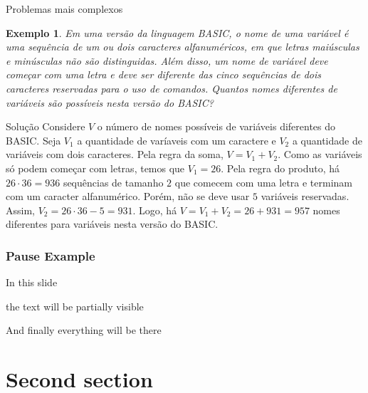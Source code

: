 \documentclass[aspectratio=169,t]{beamer}
\newtheorem{ex}{Exemplo}
\begin{document}
 \begin{frame}{Problemas mais complexos}
\footnotesize
  \begin{ex}
Em uma versão da linguagem BASIC, o nome de uma variável é uma sequência de um ou dois caracteres alfanuméricos, em que letras maiúsculas e minúsculas não são distinguidas. Além disso, um nome de variável deve começar com uma letra e deve ser diferente das cinco sequências de dois caracteres reservadas para o uso de comandos. Quantos nomes diferentes de variáveis são possíveis nesta versão do BASIC?
  \end{ex}

\begin{block}{Solução}
Considere $V$ o número de nomes possíveis de variáveis diferentes do BASIC. Seja $V_1$ a quantidade de varíaveis com um caractere e $V_2$ a quantidade de variáveis com dois caracteres. Pela regra da soma, $V=V_1+V_2$. Como as variáveis só podem começar com letras, temos que $V_1=26$. Pela regra do produto, há $26\cdot 36=936$ sequências de tamanho $2$ que comecem com uma letra e terminam com um caracter alfanumérico. Porém, não se deve usar $5$ variáveis reservadas. Assim, $V_2=26\cdot 36-5=931$. Logo, há $V=V_1+V_2 = 26+931=957$ nomes diferentes para variáveis nesta versão do BASIC.
  \end{block}

 \end{frame}


\begin{frame}
\frametitle{Pause Example}
In this slide \pause

the text will be partially visible \pause

And finally everything will be there
\end{frame}


\section{Second section}

\end{document}

